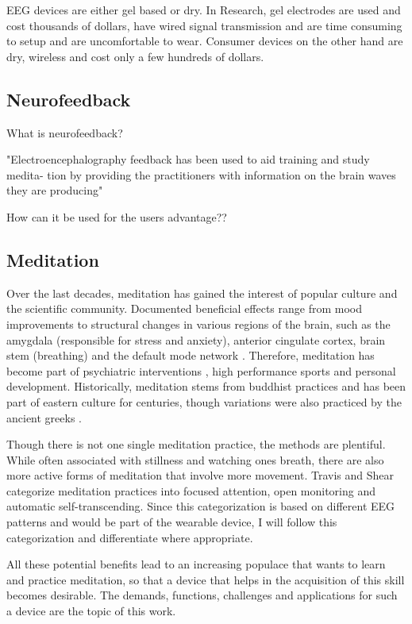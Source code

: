 \documentclass{llncs} %
\begin{document}
EEG devices are either gel based or dry. In Research, gel electrodes are used and cost thousands of dollars, have wired signal transmission and are time consuming to setup and are uncomfortable to wear.
Consumer devices on the other hand are dry, wireless and cost only a few hundreds of dollars. \cite{Decho}
\subsection{Neurofeedback}
What is neurofeedback?

"Electroencephalography feedback has been used to aid training and study medita- tion by providing the practitioners with information on the brain waves they are producing"
\cite{Tang:et al}

How can it be used for the users advantage??
\subsection{Meditation}
Over the last decades, meditation has gained the interest of popular culture and the scientific community.
Documented beneficial effects range from mood improvements to structural changes \cite{Davidson} in various regions of the brain, such as the amygdala (responsible for stress and anxiety), anterior cingulate cortex, brain stem (breathing)
and the default mode network \cite{Tang:et al}.
Therefore, meditation has become part of psychiatric interventions \cite{Hoelzel}, high performance sports and personal development.
Historically, meditation stems from buddhist practices and has been part of eastern culture for centuries, though variations were also practiced by the ancient greeks \cite{Hadot:Davidson}.

Though there is not one single meditation practice, the methods are plentiful. While often associated with stillness and watching ones breath,
there are also more active forms of meditation that involve more movement. Travis and Shear categorize meditation practices into focused attention, open monitoring and automatic self-transcending.\cite{Travis} 
Since this categorization is based on different EEG patterns and would be part of the wearable device, I will follow this categorization and differentiate where appropriate.

All these potential benefits lead to an increasing populace that wants to learn and practice meditation, so that a device that helps in the acquisition of this skill becomes desirable. 
The demands, functions, challenges and applications for such a device are the topic of this work.
\end{document}
